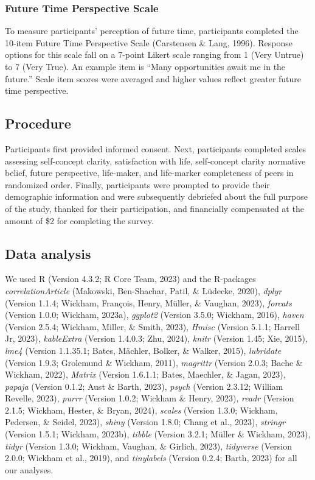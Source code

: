 \documentclass[
  man,floatsintext]{apa6}
\begin{document}
\hypertarget{future-time-perspective-scale}{%
\subsubsection{Future Time Perspective Scale}\label{future-time-perspective-scale}}

To measure participants' perception of future time, participants completed the 10-item Future Time Perspective Scale (Carstensen \& Lang, 1996). Response options for this scale fall on a 7-point Likert scale ranging from 1 (Very Untrue) to 7 (Very True). An example item is ``Many opportunities await me in the future.'' Scale item scores were averaged and higher values reflect greater future time perspective.

\hypertarget{procedure}{%
\subsection{Procedure}\label{procedure}}

Participants first provided informed consent. Next, participants completed scales assessing self-concept clarity, satisfaction with life, self-concept clarity normative belief, future perspective, life-maker, and life-marker completeness of peers in randomized order. Finally, participants were prompted to provide their demographic information and were subsequently debriefed about the full purpose of the study, thanked for their participation, and financially compensated at the amount of \$2 for completing the survey.

\hypertarget{data-analysis}{%
\subsection{Data analysis}\label{data-analysis}}

We used R (Version 4.3.2; R Core Team, 2023) and the R-packages \emph{correlationArticle} (Makowski, Ben-Shachar, Patil, \& Lüdecke, 2020), \emph{dplyr} (Version 1.1.4; Wickham, François, Henry, Müller, \& Vaughan, 2023), \emph{forcats} (Version 1.0.0; Wickham, 2023a), \emph{ggplot2} (Version 3.5.0; Wickham, 2016), \emph{haven} (Version 2.5.4; Wickham, Miller, \& Smith, 2023), \emph{Hmisc} (Version 5.1.1; Harrell Jr, 2023), \emph{kableExtra} (Version 1.4.0.3; Zhu, 2024), \emph{knitr} (Version 1.45; Xie, 2015), \emph{lme4} (Version 1.1.35.1; Bates, Mächler, Bolker, \& Walker, 2015), \emph{lubridate} (Version 1.9.3; Grolemund \& Wickham, 2011), \emph{magrittr} (Version 2.0.3; Bache \& Wickham, 2022), \emph{Matrix} (Version 1.6.1.1; Bates, Maechler, \& Jagan, 2023), \emph{papaja} (Version 0.1.2; Aust \& Barth, 2023), \emph{psych} (Version 2.3.12; William Revelle, 2023), \emph{purrr} (Version 1.0.2; Wickham \& Henry, 2023), \emph{readr} (Version 2.1.5; Wickham, Hester, \& Bryan, 2024), \emph{scales} (Version 1.3.0; Wickham, Pedersen, \& Seidel, 2023), \emph{shiny} (Version 1.8.0; Chang et al., 2023), \emph{stringr} (Version 1.5.1; Wickham, 2023b), \emph{tibble} (Version 3.2.1; Müller \& Wickham, 2023), \emph{tidyr} (Version 1.3.0; Wickham, Vaughan, \& Girlich, 2023), \emph{tidyverse} (Version 2.0.0; Wickham et al., 2019), and \emph{tinylabels} (Version 0.2.4; Barth, 2023) for all our analyses.
\end{document}
